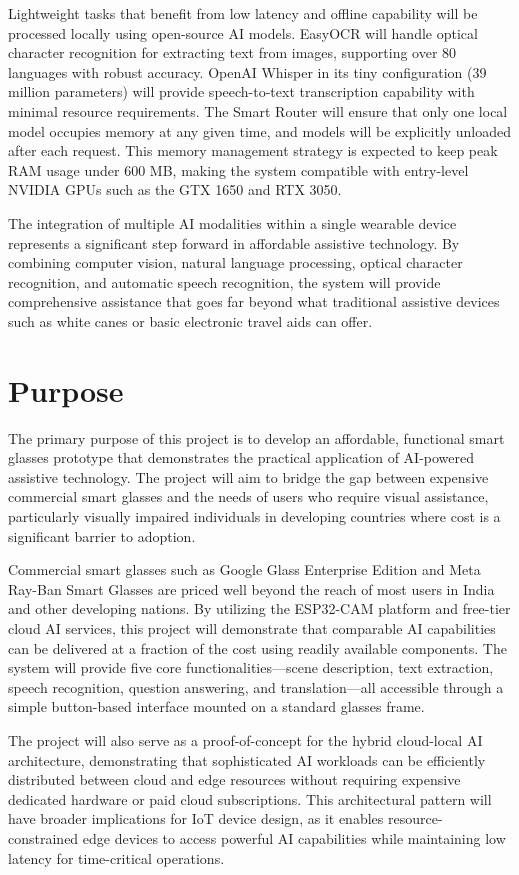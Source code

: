 Lightweight tasks that benefit from low latency and offline capability will be processed locally using open-source AI models. EasyOCR will handle optical character recognition for extracting text from images, supporting over 80 languages with robust accuracy. OpenAI Whisper in its tiny configuration (39 million parameters) will provide speech-to-text transcription capability with minimal resource requirements. The Smart Router will ensure that only one local model occupies memory at any given time, and models will be explicitly unloaded after each request. This memory management strategy is expected to keep peak RAM usage under 600 MB, making the system compatible with entry-level NVIDIA GPUs such as the GTX 1650 and RTX 3050.

The integration of multiple AI modalities within a single wearable device represents a significant step forward in affordable assistive technology. By combining computer vision, natural language processing, optical character recognition, and automatic speech recognition, the system will provide comprehensive assistance that goes far beyond what traditional assistive devices such as white canes or basic electronic travel aids can offer.

\section{Purpose}
The primary purpose of this project is to develop an affordable, functional smart glasses prototype that demonstrates the practical application of AI-powered assistive technology. The project will aim to bridge the gap between expensive commercial smart glasses and the needs of users who require visual assistance, particularly visually impaired individuals in developing countries where cost is a significant barrier to adoption.

Commercial smart glasses such as Google Glass Enterprise Edition and Meta Ray-Ban Smart Glasses are priced well beyond the reach of most users in India and other developing nations. By utilizing the ESP32-CAM platform and free-tier cloud AI services, this project will demonstrate that comparable AI capabilities can be delivered at a fraction of the cost using readily available components. The system will provide five core functionalities---scene description, text extraction, speech recognition, question answering, and translation---all accessible through a simple button-based interface mounted on a standard glasses frame.

The project will also serve as a proof-of-concept for the hybrid cloud-local AI architecture, demonstrating that sophisticated AI workloads can be efficiently distributed between cloud and edge resources without requiring expensive dedicated hardware or paid cloud subscriptions. This architectural pattern will have broader implications for IoT device design, as it enables resource-constrained edge devices to access powerful AI capabilities while maintaining low latency for time-critical operations.

